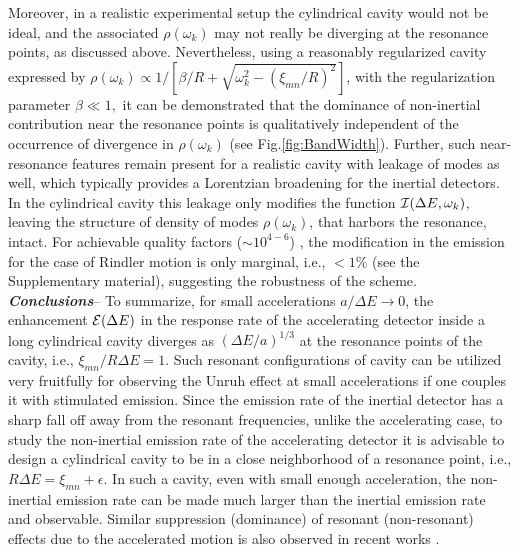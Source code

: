 \documentclass[aps,prl,nofootinbib,preprintnumbers,floatfix,twocolumn,superscriptaddress]{revtex4}
\begin{document}
Moreover, in a realistic experimental setup the cylindrical cavity would 
not be ideal, and the associated $\rho(\omega_k)$  may not really be diverging at 
the resonance points, as discussed above. 
Nevertheless, using a reasonably regularized cavity expressed by
$ \rho(\omega_k)\propto 1/[\beta/R+\sqrt{\omega_{k}^2-(\xi_{mn}/R)^2}]$, 
with the regularization parameter $\beta\ll 1,$  it can be demonstrated that the 
dominance of non-inertial contribution near the resonance points is qualitatively 
independent of the occurrence of divergence in $\rho(\omega_k)$ (see  Fig.\ref{fig:BandWidth}). 
Further, such near-resonance features 
remain present for a realistic cavity with leakage of modes as well, which 
typically provides a Lorentzian broadening for the inertial detectors. In 
the cylindrical cavity this leakage only modifies the function ${\cal I}(\Delta E,\omega_{k})$, 
leaving the structure of density of modes 
$\rho(\omega_k)$, that harbors the resonance, intact. For achievable quality factors 
($\sim 10^{4-6}$) \cite{Bertet-2016,Zmuidzinas-2010}, the modification in the emission for the case of 
Rindler motion is only marginal, i.e., $<1\%$ (see the Supplementary material), 
suggesting the robustness of the scheme.
\vskip 5pt\noindent
{\it {\bf Conclusions}}-- 
To summarize, for small accelerations $a/\Delta E \to 0$, the enhancement ${\cal E}(\Delta E)$ 
in the response rate of the accelerating detector inside a long cylindrical cavity 
diverges as $(\Delta E/a)^{1/3}$ at the resonance points of the 
cavity, i.e., $\xi_{mn}/R\Delta E=1$.  Such resonant configurations of 
cavity can be utilized 
very fruitfully for observing the Unruh effect at small accelerations if one couples 
it with stimulated emission.
Since the emission rate of the inertial detector has a sharp fall off away from the 
resonant frequencies, unlike the accelerating case, to study the non-inertial emission 
rate of the accelerating detector it is advisable to design a cylindrical 
cavity to be in a close neighborhood of a resonance 
point, i.e., $R\Delta E=\xi_{mn}+\epsilon$. In such a cavity, even with 
small enough acceleration, the non-inertial emission rate can be made much larger than the 
inertial emission rate and observable. Similar suppression (dominance) of 
resonant (non-resonant) effects due to the accelerated motion is also observed in 
recent works \cite{Lochan-2020, Kempf-2021}. 
\end{document}
